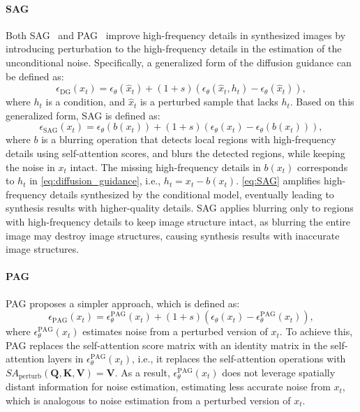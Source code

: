 \paragraph{SAG}
Both SAG~\cite{sag} and PAG~\cite{pag} improve high-frequency details in synthesized images by introducing perturbation to the high-frequency details in the estimation of the unconditional noise. Specifically, a generalized form of the diffusion guidance can be defined as:
\begin{equation}
    \epsilon_\textrm{DG}(x_t)=\epsilon_\theta(\hat{x}_t)+(1+s)(\epsilon_\theta(\hat{x}_t, h_t)-\epsilon_\theta(\hat{x}_t)),
    \label{eq:diffusion_guidance}
\end{equation}
where $h_t$ is a condition, and $\hat{x}_t$ is a perturbed sample that lacks $h_t$.
Based on this generalized form, SAG is defined as:
\begin{equation}
    \epsilon_\textrm{SAG}(x_t)=\epsilon_\theta(b(x_t))+(1+s)(\epsilon_\theta(x_t)-\epsilon_\theta(b(x_t))),
    \label{eq:SAG}
\end{equation}
where $b$ is a blurring operation that detects local regions with high-frequency details using self-attention scores, and blurs the detected regions, while keeping the noise in $x_t$ intact.
The missing high-frequency details in $b(x_t)$ corresponds to $h_t$ in \cref{eq:diffusion_guidance}, i.e., $h_t = x_t - b(x_t)$.
\cref{eq:SAG} amplifies high-frequency details synthesized by the conditional model, eventually leading to synthesis results with higher-quality details.
SAG applies blurring only to regions with high-frequency details to keep image structure intact, as blurring the entire image may destroy image structures, causing synthesis results with inaccurate image structures.

\paragraph{PAG}
PAG proposes a simpler approach, which is defined as:
\begin{equation}
    \epsilon_\textrm{PAG}(x_t)=\epsilon^\text{PAG}_\theta(x_t)+(1+s)(\epsilon_\theta(x_t)-\epsilon_\theta^\text{PAG}(x_t)),
    \label{eq:PAG}
\end{equation}
where $\epsilon^\text{PAG}_\theta(x_t)$ estimates noise from a perturbed version of $x_t$.
To achieve this, PAG replaces the self-attention score matrix with an identity matrix in the self-attention layers in $\epsilon^\text{PAG}_\theta(x_t)$, i.e., it replaces the self-attention operations with $SA_\text{perturb}(\bm{Q},\bm{K},\bm{V})=\bm{V}$.
As a result, $\epsilon^\text{PAG}_\theta(x_t)$ does not leverage spatially distant information for noise estimation, estimating less accurate noise from $x_t$, which is analogous to noise estimation from a perturbed version of $x_t$.

